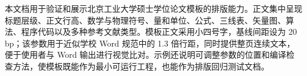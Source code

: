 \begin{cabstract}
本文档用于验证和展示北京工业大学硕士学位论文模板的排版能力。正文集中呈现标题层级、正文行高、数学与物理符号、量和单位、公式、三线表、矢量图、算法、程序代码以及多种参考文献类型。模板正文采用小四号字，基线间距设为 20 bp；该参数用于近似学校 Word 规范中的 1.3 倍行距，同时提供整页连续文本，便于使用者与 Word 输出进行视觉比对。示例还说明可调整参数的位置和编译检查方法，使模板既能作为最小可运行工程，也能作为排版回归测试文档。

\end{cabstract}
